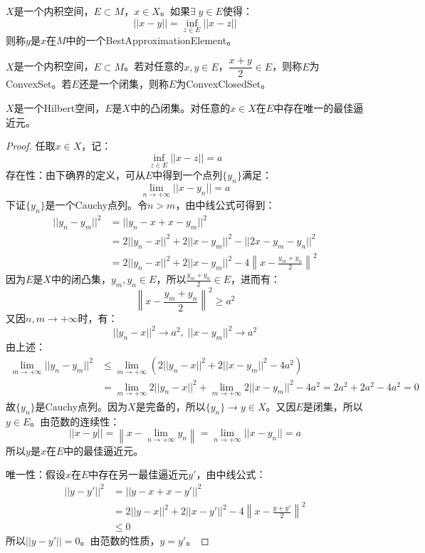 \begin{definition}
	$X$是一个内积空间，$E\subset M$，$x\in X$。如果$\exists\;y\in E$使得：
	\begin{equation*}
		||x-y||=\inf_{z\in E}||x-z||
	\end{equation*}
	则称$y$是$x$在$M$中的一个\gls{BestApproximationElement}。
\end{definition}
\begin{definition}
	$X$是一个内积空间，$E\subset M$。若对任意的$x,y\in E$，$\dfrac{x+y}{2}\in E$，则称$E$为\gls{ConvexSet}。若$E$还是一个闭集，则称$E$为\gls{ConvexClosedSet}。
\end{definition}
\begin{theorem}
	$X$是一个Hilbert空间，$E$是$X$中的凸闭集。对任意的$x\in X$在$E$中存在唯一的最佳逼近元。
\end{theorem}
\begin{proof}
	任取$x\in X$，记：
	\begin{equation*}
		\inf_{z\in E}||x-z||=a
	\end{equation*}
	\hspace{2em}存在性：由下确界的定义，可从$E$中得到一个点列$\{y_n\}$满足：
	\begin{equation*}
		\lim_{n\to+\infty}||x-y_n||=a
	\end{equation*}
	下证$\{y_n\}$是一个Cauchy点列。令$n>m$，由中线公式可得到：
	\begin{align*}
		||y_n-y_m||^2
		&=||y_n-x+x-y_m||^2 \\
		&=2||y_n-x||^2+2||x-y_m||^2-||2x-y_m-y_n||^2 \\
		&=2||y_n-x||^2+2||x-y_m||^2-4\left\|x-\frac{y_m+y_n}{2}\right\|^2
	\end{align*}
	因为$E$是$X$中的闭凸集，$y_m,y_n\in E$，所以$\frac{y_m+y_n}{2}\in E$，进而有：
	\begin{equation*}
		\left\|x-\frac{y_m+y_n}{2}\right\|^2\geqslant a^2
	\end{equation*}
	又因$n,m\to+\infty$时，有：
	\begin{equation*}
		||y_n-x||^2\to a^2,\;||x-y_m||^2\to a^2
	\end{equation*}
	由上述：
	\begin{align*}
		\lim_{m\to+\infty}||y_n-y_m||^2
		&\leqslant\lim_{m\to+\infty}\left(2||y_n-x||^2+2||x-y_m||^2-4a^2\right) \\
		&=\lim_{m\to+\infty}2||y_n-x||^2+\lim_{m\to+\infty}2||x-y_m||^2-4a^2=2a^2+2a^2-4a^2=0
	\end{align*}
	故$\{y_n\}$是Cauchy点列。因为$X$是完备的，所以$\{y_n\}\to y\in X$。又因$E$是闭集，所以$y\in E$。由范数的连续性：
	\begin{equation*}
		||x-y||=\left\|x-\lim_{n\to+\infty}y_n\right\|=\lim_{n\to+\infty}||x-y_n||=a
	\end{equation*}
	所以$y$是$x$在$E$中的最佳逼近元。\par
	唯一性：假设$x$在$E$中存在另一最佳逼近元$y'$，由中线公式：
	\begin{align*}
		||y-y'||^2
		&=||y-x+x-y'||^2 \\
		&=2||y-x||^2+2||x-y'||^2-4\left\|x-\frac{y+y'}{2}\right\|^2 \\
		&\leqslant0
	\end{align*}
	所以$||y-y'||=0$。由范数的性质，$y=y'$。
\end{proof}
